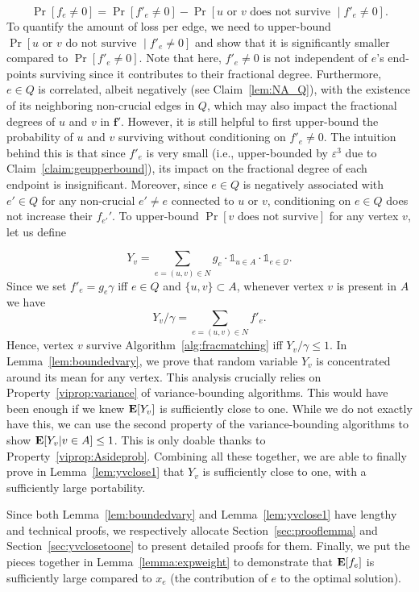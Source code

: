 \documentclass[letterpaper,11pt]{article}
\renewcommand{\epsilon}{\varepsilon}
\DeclareMathOperator{\E}{\ensuremath{\normalfont \textbf{E}}}
\renewcommand{\epsilon}[0]{\ensuremath{\varepsilon}}
\begin{document}
$$\Pr[f_e\neq 0]= \Pr[f'_e\neq 0] - \Pr[u \text{ or } v \text{ does not survive } \mid f'_e\neq 0].$$
To quantify the amount of loss per edge, we need to upper-bound $\Pr[u \text{ or } v \text{ do not survive } \mid f'_e\neq 0]$ and show that it is significantly smaller compared to $\Pr[f'_e\neq 0]$. Note that here, $f'_e\neq 0$ is not independent of $e$'s end-points surviving since it contributes to their fractional degree. Furthermore,  $e\in Q$ is correlated, albeit negatively (see Claim~\ref{lem:NA_Q}), with the existence of its neighboring non-crucial edges in $Q$, which may also impact the fractional degrees of $u$ and $v$ in $\bm{f'}$.  However, it is still helpful to first upper-bound the probability of $u$ and $v$ surviving without conditioning on  $f'_e\neq 0$. The intuition behind this is that since $f'_e$ is very small (i.e., upper-bounded by $\epsilon^3$  due to Claim~\ref{claim:geupperbound}), its impact on the fractional degree of each endpoint is insignificant. Moreover, since $e\in Q$ is negatively associated with $e'\in Q$ for any non-crucial $e'\neq e$ connected to $u$ or $v$,  conditioning on $e\in Q$ does not increase their $f_{e'}'$. To upper-bound $\Pr[v \text{ does not survive}]$ for any vertex $v$, let us define

\begin{equation}
Y_v = \sum_{e=(u,v) \in N} g_e \cdot \mathds{1}_{u\in A} \cdot \mathds{1}_{e\in \mathcal{Q}}.
\end{equation}
Since we set $f'_e=g_e\gamma$ iff $e\in Q$ and $\{u , v\}\subset A$, whenever vertex $v$ is present in $A$ we have $$Y_v/\gamma =\sum_{e=(u,v) \in N} f'_e.$$ Hence, vertex $v$  survive Algorithm~\ref{alg:fracmatching} iff $Y_v/\gamma\leq 1$. In Lemma~\ref{lem:boundedvary}, we prove that random variable $Y_v$ is concentrated around its mean for any vertex. This analysis crucially relies on Property~\ref{viprop:variance} of variance-bounding algorithms. This would have been enough if we knew $\E[Y_v]$ is sufficiently close to one. While we do not exactly have this, we can use the second property of the variance-bounding algorithms to show $\E[Y_v | v\in A]\leq 1$. This is only doable thanks to Property~\ref{viprop:Asideprob}. Combining all these together, we are able to finally prove in Lemma~\ref{lem:yvclose1} that $Y_v$ is sufficiently close to one, with a sufficiently large portability.  



Since both Lemma~\ref{lem:boundedvary} and Lemma~\ref{lem:yvclose1}  have lengthy and technical proofs, we respectively allocate Section~\ref{sec:prooflemma} and Section~\ref{sec:yvclosetoone} to present detailed proofs for them. Finally, we put  the pieces together in Lemma~\ref{lemma:expweight} to demonstrate that $\E[f_e]$ is sufficiently large compared to $x_e$ (the contribution of $e$ to the optimal solution). 
\end{document}

